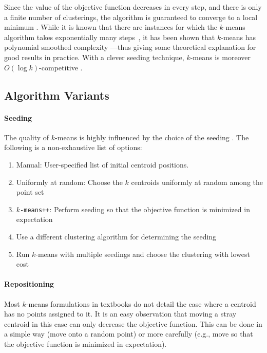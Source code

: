 \documentclass[letterpaper,11pt]{scrreprt}
\numberwithin{equation}{section}
\theoremstyle{algorithm}
\begin{document}
Since the value of the objective function decreases in every step, and there is only a finite number of clusterings, the algorithm is guaranteed to converge to a local minimum \cite[Section~16.4]{CS08a}. While it is known that there are instances for which the $k$-means algorithm takes exponentially many steps~\cite{V09a}, it has been shown that $k$-means has polynomial smoothed complexity \cite{AMR09a}---thus giving some theoretical explanation for good results in practice. With a clever seeding technique, $k$-means is moreover $O(\log k)$-competitive \cite{AV07a}.


\subsection{Algorithm Variants}

\paragraph{Seeding}

The quality of $k$-means is highly influenced by the choice of the seeding \cite{AV07a}. The following is a non-exhaustive list of options:
\begin{enumerate}
	\item Manual: User-specified list of initial centroid positions.
	\item Uniformly at random: Choose the $k$ centroids uniformly at random among the point set
	\item \texttt{$k$-means++}: Perform seeding so that the objective function is minimized in expectation \cite{AV07a}
	\item Use a different clustering algorithm for determining the seeding \cite{MNU00a}
	\item Run $k$-means with multiple seedings and choose the clustering with lowest cost
\end{enumerate}

\paragraph{Repositioning}

Most $k$-means formulations in textbooks do not detail the case where a centroid has no points assigned to it. It is an easy observation that moving a stray centroid in this case can only decrease the objective function. This can be done in a simple way (move onto a random point) or more carefully (e.g., move so that the objective function is minimized in expectation).
\end{document}
